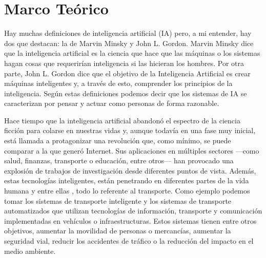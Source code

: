 
\chapter{Marco Teórico}
\label{marcoteorico}


Hay muchas definiciones de inteligencia artificial (IA) pero, a mi entender, hay dos que destacan: la de Marvin Minsky y John L. Gordon. Marvin Minsky dice que la inteligencia
artificial es la ciencia que hace que las máquinas o los sistemas hagan cosas que requerirían inteligencia si las hicieran los hombres. Por otra parte, John L. Gordon dice que el objetivo de la Inteligencia Artificial es crear máquinas inteligentes y, a través de esto, comprender los principios de la inteligencia. Según estas definiciones podemos decir que los sistemas de IA se caracterizan por pensar y actuar como personas de forma razonable.


Hace tiempo que la inteligencia artificial abandonó el espectro de la ciencia ficción para colarse en nuestras vidas y, aunque todavía en una fase muy inicial, está llamada a protagonizar una revolución que, como mínimo, se puede comparar a la que generó Internet. Sus aplicaciones en múltiples sectores —como salud, finanzas, transporte o educación, entre otros— han provocado una explosión de trabajos de investigación desde diferentes puntos de vista. Además, estas tecnologías inteligentes, están penetrando en diferentes partes de la vida humana y entre ellas , todo lo referente al transporte. Como ejemplo podemos tomar los sistemas de transporte inteligente y los sistemas de transporte automatizados que utilizan tecnologías de información, transporte y comunicación implementadas en vehículos o infraestructuras. Estos sistemas tienen entre otros objetivos, aumentar la movilidad de personas o mercancías, aumentar la seguridad vial, reducir los accidentes de tráfico o la reducción del impacto en el medio ambiente.


